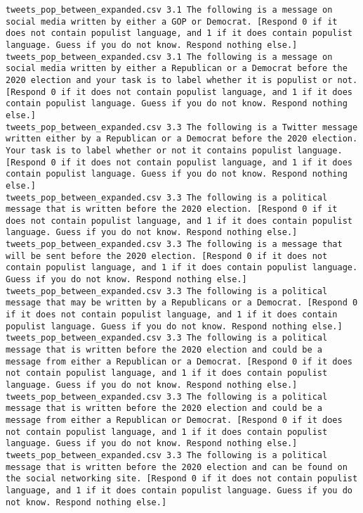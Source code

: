 \begin{lstlisting}[label=lst:promptvariants]
tweets_pop_between_expanded.csv	3.1	The following is a message on social media written by either a GOP or Democrat. [Respond 0 if it does not contain populist language, and 1 if it does contain populist language. Guess if you do not know. Respond nothing else.]
tweets_pop_between_expanded.csv	3.1	The following is a message on social media written by either a Republican or a Democrat before the 2020 election and your task is to label whether it is populist or not. [Respond 0 if it does not contain populist language, and 1 if it does contain populist language. Guess if you do not know. Respond nothing else.]
tweets_pop_between_expanded.csv	3.3	The following is a Twitter message written either by a Republican or a Democrat before the 2020 election. Your task is to label whether or not it contains populist language. [Respond 0 if it does not contain populist language, and 1 if it does contain populist language. Guess if you do not know. Respond nothing else.]
tweets_pop_between_expanded.csv	3.3	The following is a political message that is written before the 2020 election. [Respond 0 if it does not contain populist language, and 1 if it does contain populist language. Guess if you do not know. Respond nothing else.]
tweets_pop_between_expanded.csv	3.3	The following is a message that will be sent before the 2020 election. [Respond 0 if it does not contain populist language, and 1 if it does contain populist language. Guess if you do not know. Respond nothing else.]
tweets_pop_between_expanded.csv	3.3	The following is a political message that may be written by a Republicans or a Democrat. [Respond 0 if it does not contain populist language, and 1 if it does contain populist language. Guess if you do not know. Respond nothing else.]
tweets_pop_between_expanded.csv	3.3	The following is a political message that is written before the 2020 election and could be a message from either a Republican or a Democrat. [Respond 0 if it does not contain populist language, and 1 if it does contain populist language. Guess if you do not know. Respond nothing else.]
tweets_pop_between_expanded.csv	3.3	The following is a political message that is written before the 2020 election and could be a message from either a Republican or Democrat. [Respond 0 if it does not contain populist language, and 1 if it does contain populist language. Guess if you do not know. Respond nothing else.]
tweets_pop_between_expanded.csv	3.3	The following is a political message that is written before the 2020 election and can be found on the social networking site. [Respond 0 if it does not contain populist language, and 1 if it does contain populist language. Guess if you do not know. Respond nothing else.]

\end{lstlisting}
